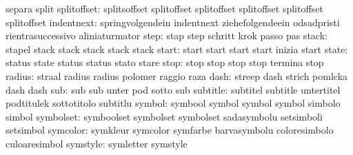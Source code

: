                            separa                    split %
splitoffset: splitsoffset        splitoffset
             splitoffset         splitoffset
             splitoffset         splitoffset %
               indentnext: springvolgendein          indentnext
                           ziehefolgendeein          odsadpristi
                           rientrasuccessivo         aliniaturmator
                     step: stap                      step
                           schritt                   krok
                           passo                     pas
                    stack: stapel                    stack
                           stack                     stack
                           stack                     stack %
                    start: start                     start
                           start                     start
                           inizia                    start
                    state: status                    state
                           status                    status
                           stato                     stare
                     stop: stop                      stop
                           stop                      stop
                           termina                   stop
                   radius: straal                    radius
                           radius                    polomer
                           raggio                    raza
                     dash: streep                    dash
                           strich                    pomlcka
                           dash                      dash %
                      sub: sub                       sub
                           unter                     pod
                           sotto                     sub
                 subtitle: subtitel                  subtitle
                           untertitel                podtitulek
                           sottotitolo               subtitlu
                   symbol: symbool                   symbol
                           symbol                    symbol
                           simbolo                   simbol
                symbolset: symboolset                symbolset
                           symbolset                 sadasymbolu
                           setsimboli                setsimbol
                 symcolor: symkleur                  symcolor
                           symfarbe                  barvasymbolu
                           coloresimbolo             culoaresimbol
                 symstyle: symletter                 symstyle
